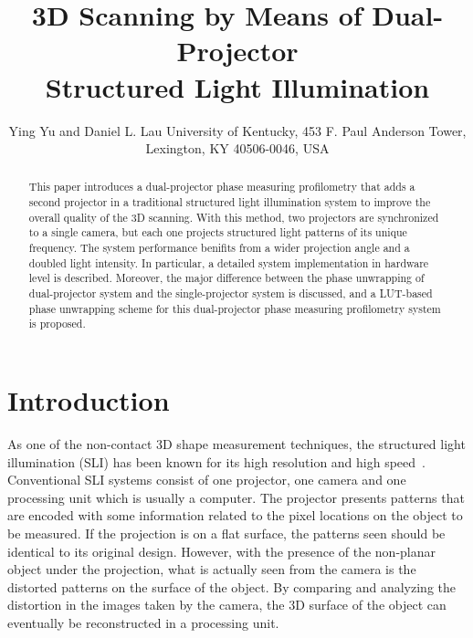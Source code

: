 \documentclass[]{spie}  %
\title{3D Scanning by Means of Dual-Projector \\ Structured Light Illumination}
\author{Ying Yu\supit{a} and Daniel L. Lau\supit{a}
\skiplinehalf
\supit{a}University of Kentucky, 453 F. Paul Anderson Tower, Lexington, KY 40506-0046, USA
}
\begin{document}
 
  \maketitle 

\begin{abstract}
This paper introduces a dual-projector phase measuring profilometry that adds a second projector in a traditional structured light illumination system to improve the overall quality of the 3D scanning. With this method, two projectors are synchronized to a single camera, but each one projects structured light patterns of its unique frequency. The system performance benifits from a wider projection angle and a doubled light intensity. In particular, a detailed system implementation in hardware level is described. Moreover, the major difference between the phase unwrapping of dual-projector system and the single-projector system is discussed, and a LUT-based phase unwrapping scheme for this dual-projector phase measuring profilometry system is proposed. 
\end{abstract}



\section{Introduction}
\label{sec:intro}  %
As one of the non-contact 3D shape measurement techniques, the structured light illumination (SLI) has been known for its high resolution and high speed~\cite{chen00}. Conventional SLI systems consist of one projector, one camera and one processing unit which is usually a computer. The projector presents patterns that are encoded with some information related to the pixel locations on the object to be measured. If the projection is on a flat surface, the patterns seen should be identical to its original design. However, with the presence of the non-planar object under the projection, what is actually seen from the camera is the distorted patterns on the surface of the object. By comparing and analyzing the distortion in the images taken by the camera, the 3D surface of the object can eventually be reconstructed in a processing unit.
\end{document}
